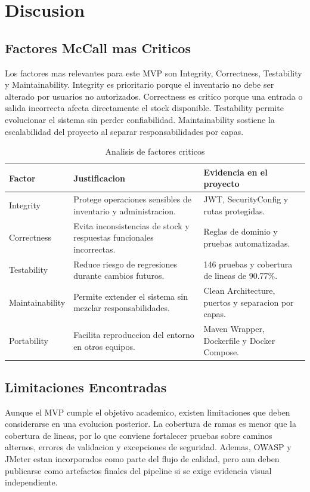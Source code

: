 \documentclass[11pt,oneside]{article}
\begin{document}
\section{Discusion}

\subsection{Factores McCall mas Criticos}

Los factores mas relevantes para este MVP son Integrity, Correctness, Testability y Maintainability. Integrity es prioritario porque el inventario no debe ser alterado por usuarios no autorizados. Correctness es critico porque una entrada o salida incorrecta afecta directamente el stock disponible. Testability permite evolucionar el sistema sin perder confiabilidad. Maintainability sostiene la escalabilidad del proyecto al separar responsabilidades por capas.

\begin{table}[H]
\centering
\small
\caption{Analisis de factores criticos}
\begin{tabularx}{\textwidth}{p{}Yp{.28\textwidth}}
\toprule
Factor & Justificacion & Evidencia en el proyecto\\
\midrule
Integrity & Protege operaciones sensibles de inventario y administracion. & JWT, SecurityConfig y rutas protegidas.\\
Correctness & Evita inconsistencias de stock y respuestas funcionales incorrectas. & Reglas de dominio y pruebas automatizadas.\\
Testability & Reduce riesgo de regresiones durante cambios futuros. & 146 pruebas y cobertura de lineas de 90.77\%.\\
Maintainability & Permite extender el sistema sin mezclar responsabilidades. & Clean Architecture, puertos y separacion por capas.\\
Portability & Facilita reproduccion del entorno en otros equipos. & Maven Wrapper, Dockerfile y Docker Compose.\\
\bottomrule
\end{tabularx}
\end{table}

\subsection{Limitaciones Encontradas}

Aunque el MVP cumple el objetivo academico, existen limitaciones que deben considerarse en una evolucion posterior. La cobertura de ramas es menor que la cobertura de lineas, por lo que conviene fortalecer pruebas sobre caminos alternos, errores de validacion y excepciones de seguridad. Ademas, OWASP y JMeter estan incorporados como parte del flujo de calidad, pero aun deben publicarse como artefactos finales del pipeline si se exige evidencia visual independiente.
\end{document}
